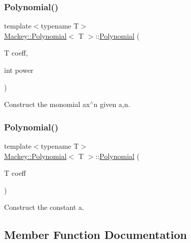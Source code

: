 \subsubsection{\texorpdfstring{Polynomial()}{Polynomial()}\hspace{0.1cm}{\footnotesize\ttfamily [3/4]}}
{\footnotesize\ttfamily template$<$typename T$>$ \\
\hyperlink{classMackey_1_1Polynomial}{Mackey\+::\+Polynomial}$<$ T $>$\+::\hyperlink{classMackey_1_1Polynomial}{Polynomial} (\begin{DoxyParamCaption}\item[{T}]{coeff,  }\item[{int}]{power }\end{DoxyParamCaption})\hspace{0.3cm}{\ttfamily [inline]}}



Construct the monomial ax$^\wedge$n given a,n. 

\mbox{\label{classMackey_1_1Polynomial_a665435bc329352f11b1e424c126d914b}} 
\subsubsection{\texorpdfstring{Polynomial()}{Polynomial()}\hspace{0.1cm}{\footnotesize\ttfamily [4/4]}}
{\footnotesize\ttfamily template$<$typename T$>$ \\
\hyperlink{classMackey_1_1Polynomial}{Mackey\+::\+Polynomial}$<$ T $>$\+::\hyperlink{classMackey_1_1Polynomial}{Polynomial} (\begin{DoxyParamCaption}\item[{T}]{coeff }\end{DoxyParamCaption})\hspace{0.3cm}{\ttfamily [inline]}}



Construct the constant a. 



\subsection{Member Function Documentation}
\mbox{\label{classMackey_1_1Polynomial_ad2981034fac81d4ad3f2751c757af5d3}} 
